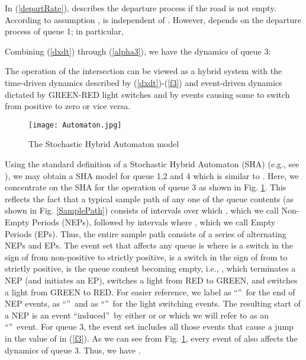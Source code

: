 \documentclass{ifacconf}\usepackage{graphicx}
\begin{document}
In (\ref{departRate}),  describes the departure process if the road
is not empty. According to assumption ,  is independent
of . However,   depends on the departure process
 of queue 1; in particular,

Combining (\ref{dxdt}) through (\ref{alpha3}), we have the dynamics of queue
3:



The operation of the intersection can be viewed as a hybrid system with the
time-driven dynamics described by (\ref{dxdt})-(\ref{f3}) and event-driven
dynamics dictated by GREEN-RED light switches and by events causing some
 to switch from positive to zero or vice versa.

\begin{figure}[tbh]
\centering
\texttt{[image: Automaton.jpg]} \caption{The Stochastic Hybrid
Automaton model}\label{Automaton}\end{figure}

Using the standard definition of a Stochastic Hybrid Automaton (SHA) (e.g.,
see \cite{Cassandras08}), we may obtain a SHA model for queue 1,2 and 4 which
is similar to \cite{GengCDC12}. Here, we concentrate on the SHA for the
operation of queue 3 as shown in Fig. \ref{Automaton}. This reflects the fact
that a typical sample path of any one of the queue contents (as shown in Fig.
\ref{SamplePath}) consists of intervals over which , which we call
Non-Empty Periods (NEPs), followed by intervals where , which we
call Empty Periods (EPs). Thus, the entire sample path consists of a series of
alternating NEPs and EPs. The event set that
affects any queue  is 
where  is a switch in the sign of  from
non-positive to strictly positive,  is a switch in the sign of
 from  to strictly positive,  is the queue content
becoming empty, i.e., , which terminates a NEP (and initiates an EP),
 switches a light from RED to GREEN, and  switches a light from
GREEN to RED. For easier reference, we label  as \textquotedblleft \textquotedblright\ for the end of NEP events,  as
\textquotedblleft\textquotedblright\ and  as \textquotedblleft \textquotedblright\ for the light switching events. The resulting
start of a NEP is an event \textquotedblleft induced\textquotedblright\ by
either  or  or  which we will refer to as an
\textquotedblleft\textquotedblright\ event. For queue 3, the event set
includes all those events that cause a jump in the value of 
in (\ref{f3}). As we can see from Fig. \ref{Automaton}, every event of
 also affects the dynamics of queue 3. Thus, we have .
\end{document}
